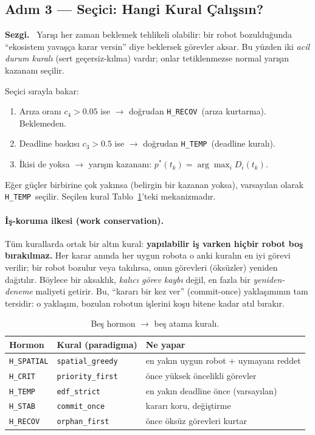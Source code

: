 \documentclass[11pt,a4paper]{article}
\newenvironment{sezgi}
  {\begin{lrbox}{\sezgibox}%
   \begin{minipage}{\dimexpr\linewidth-2\fboxsep-2\fboxrule\relax}%
   \small\textbf{\color{blue!55!black}Sezgi.}~}
  {\end{minipage}\end{lrbox}%
   \par\smallskip\noindent
   \fcolorbox{blue!45!black}{blue!5}{\usebox{\sezgibox}}%
   \par\smallskip}
\newcommand{\Hspatial}{\texttt{H\_SPATIAL}}
\newcommand{\Hcrit}{\texttt{H\_CRIT}}
\newcommand{\Htemp}{\texttt{H\_TEMP}}
\newcommand{\Hstab}{\texttt{H\_STAB}}
\newcommand{\Hrecov}{\texttt{H\_RECOV}}
\begin{document}
\subsection{Adım 3 --- Seçici: Hangi Kural Çalışsın?}
\label{sec:dispatch}

\begin{sezgi}
Yarışı her zaman beklemek tehlikeli olabilir: bir robot bozulduğunda
``ekosistem yavaşça karar versin'' diye beklersek görevler aksar. Bu yüzden iki
\emph{acil durum kuralı} (sert geçersiz-kılma) vardır; onlar tetiklenmezse
normal yarışın kazananı seçilir.
\end{sezgi}

Seçici sırayla bakar:
\begin{enumerate}
  \item Arıza oranı $c_4>0.05$ ise $\rightarrow$ doğrudan \Hrecov\ (arıza
        kurtarma). Beklemeden.
  \item Deadline baskısı $c_3>0.5$ ise $\rightarrow$ doğrudan \Htemp\
        (deadline kuralı).
  \item İkisi de yoksa $\rightarrow$ yarışın kazananı:
        $p^\ast(t_k)=\arg\max_i D_i(t_k)$.
\end{enumerate}
Eğer güçler birbirine çok yakınsa (belirgin bir kazanan yoksa), varsayılan
olarak \Htemp\ seçilir. Seçilen kural Tablo~\ref{tab:hormones}'teki
mekanizmadır.

\paragraph{İş-koruma ilkesi (work conservation).} Tüm kurallarda ortak bir
altın kural: \textbf{yapılabilir iş varken hiçbir robot boş bırakılmaz.} Her
karar anında her uygun robota o anki kuralın en iyi görevi verilir; bir robot
bozulur veya takılırsa, onun görevleri (öksüzler) yeniden dağıtılır. Böylece
bir aksaklık, \emph{kalıcı görev kaybı} değil, en fazla bir
\emph{yeniden-deneme} maliyeti getirir. Bu, ``kararı bir kez ver'' (commit-once)
yaklaşımının tam tersidir: o yaklaşım, bozulan robotun işlerini koşu bitene
kadar atıl bırakır.

\begin{table}[t]
\centering
\caption{Beş hormon $\rightarrow$ beş atama kuralı.}
\label{tab:hormones}
\small
\begin{tabular}{lll}
\toprule
\textbf{Hormon} & \textbf{Kural (paradigma)} & \textbf{Ne yapar} \\
\midrule
\Hspatial & \texttt{spatial\_greedy} & en yakın uygun robot + uymayanı reddet \\
\Hcrit    & \texttt{priority\_first} & önce yüksek öncelikli görevler \\
\Htemp    & \texttt{edf\_strict}     & en yakın deadline önce (varsayılan) \\
\Hstab    & \texttt{commit\_once}    & kararı koru, değiştirme \\
\Hrecov   & \texttt{orphan\_first}   & önce öksüz görevleri kurtar \\
\bottomrule
\end{tabular}
\end{table}
\end{document}
